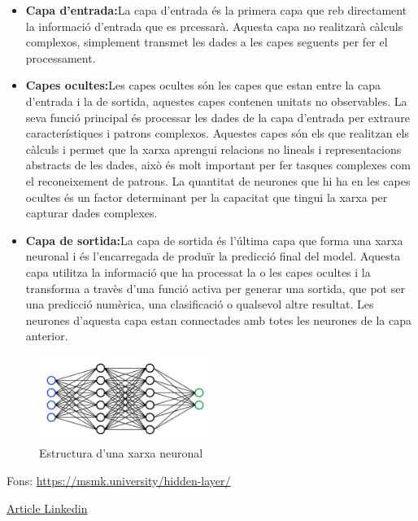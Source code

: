 {\begin{itemize}
 \item \textbf{Capa d'entrada:}La capa d'entrada és la primera capa que reb directament la informació d'entrada que es prcessarà. Aquesta capa no realitzarà càlculs complexos, simplement transmet les dades a les capes seguents per fer el processament.
 \item \textbf{Capes ocultes:}Les capes ocultes són les capes que estan entre la capa d'entrada i la de sortida, aquestes capes contenen unitats no observables. La seva funció principal és processar les dades de la capa d'entrada per extraure característiques i patrons complexos. Aquestes capes són els que realitzan els càlculs i permet que la xarxa aprengui relacions no lineals i representacions abstracts de les dades, això és molt important per fer tasques complexes com el reconeixement de patrons. La quantitat de neurones que hi ha en les capes ocultes és un factor determinant per la capacitat que tingui la xarxa per capturar dades complexes.
 \item \textbf{Capa de sortida:}La capa de sortida és l'última capa que forma una xarxa neuronal i és l'encarregada de produïr la predicció final del model. Aquesta capa utilitza la informació que ha processat la o les capes ocultes i la transforma a travès d'una funció activa per generar una sortida, que pot ser una predicció numèrica, una clasificació o qualsevol altre resultat. Les neurones d'aquesta capa estan connectades amb totes les neurones de la capa anterior.
 \end{itemize}


\begin{figure}[h!]
    \centering
    \includegraphics[width=0.5\textwidth]{./figures/xarxa.png}
    \caption{Estructura d'una xarxa neuronal}
\end{figure}

Fons: \href{https://msmk.university/hidden-layer/}{https://msmk.university/hidden-layer/}

\href{https://www.linkedin.com/advice/0/what-some-examples-linear-nonlinear-models-real-world?lang=es&lang=es&originalSubdomain=es}{Article Linkedin}

}
